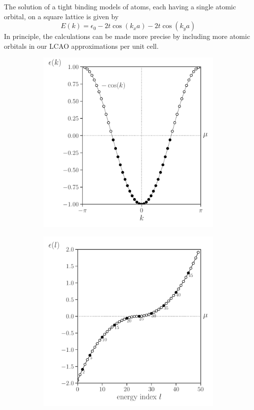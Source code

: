 \documentclass[11pt, a4paper]{article}
\theoremstyle{definition} %
\begin{document}
The solution of a tight binding models of atoms, each having a single atomic orbital, on a square lattice is given by
\begin{equation}
	E(k) = \epsilon_0 - 2t\cos(k_x a) - 2t\cos(k_ya)
\end{equation}
In principle, the calculations can be made more precise by including more atomic orbitals in our LCAO approximations per unit cell.


\begin{figure}[h]
\centering
\begin{subfigure}[t]{0.49\textwidth}
	\centering
	\includegraphics[width =\textwidth]{dispersionrelationH0}\end{subfigure}
\begin{subfigure}[t]{0.49\textwidth}
	\centering
	\includegraphics[width =\textwidth]{dispersionrelationSSD}

\end{subfigure}
\end{figure}
\end{document}
